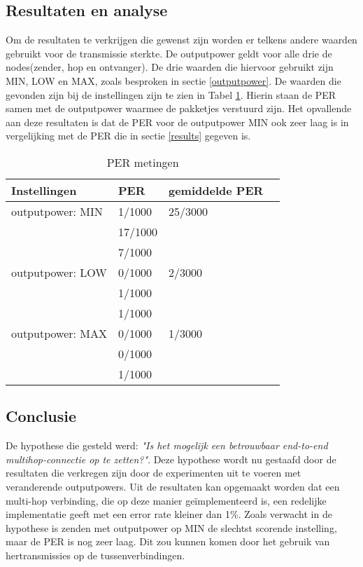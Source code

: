 \documentclass{article}
\begin{document}
\subsection{Resultaten en analyse}

Om de resultaten te verkrijgen die gewenst zijn worden er telkens andere waarden gebruikt voor de transmissie sterkte.
De outputpower geldt voor alle drie de nodes(zender, hop en ontvanger). De drie waarden die hiervoor gebruikt zijn MIN, LOW en MAX, zoals besproken in sectie \ref{outputpower}. De waarden die gevonden zijn bij de instellingen zijn te zien in Tabel \ref{table:hopresults}. Hierin staan de PER samen met de outputpower waarmee de pakketjes verstuurd zijn. Het opvallende aan deze resultaten is dat de PER voor de outputpower MIN ook zeer laag is in vergelijking met de PER die in sectie \ref{results} gegeven is.

\begin{table}[h]
\centering \caption{PER metingen}
\label{table:hopresults}
    \begin{tabular}{ | l | l | l | p{5cm} |}
    \hline
    Instellingen 				& PER 		& gemiddelde PER\\ \hline
    outputpower: MIN 			& 1/1000 	& 25/3000		\\
    							& 17/1000 	& 				\\
   								& 7/1000	&  				\\ \hline
    outputpower: LOW 			& 0/1000 	& 2/3000		\\
    							& 1/1000 	& 				\\
   								& 1/1000	&  				\\ \hline
    outputpower: MAX 			& 0/1000 	& 1/3000		\\
    							& 0/1000 	& 				\\
   								& 1/1000	&  				\\ \hline
    \end{tabular}
\end{table}
\newpage
\subsection{Conclusie}

De hypothese die gesteld werd: \textit{"Is het mogelijk een betrouwbaar end-to-end multihop-connectie op te zetten?"}.
Deze hypothese wordt nu gestaafd door de resultaten die verkregen zijn door de experimenten uit te voeren met veranderende outputpowers. 
Uit de resultaten kan opgemaakt worden dat een multi-hop verbinding, die op deze manier ge\"{i}mplementeerd is, een redelijke implementatie geeft met een error rate kleiner dan 1\%. Zoals verwacht in de hypothese is zenden met outputpower op MIN de slechtst scorende instelling, maar de PER is nog zeer laag. Dit zou kunnen komen door het gebruik van hertransmissies op de tussenverbindingen.
\end{document}
